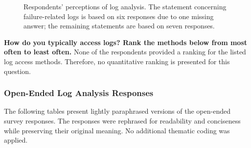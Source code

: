 \begin{figure}[H]
    \caption{Respondents' perceptions of log analysis. The statement
    concerning failure-related logs is based on six responses due to
    one missing answer; the remaining statements are based on seven
    responses.}
    \label{fig:appendix-log-analysis-perceptions}
\end{figure}

\vspace{-0.4em}
{\footnotesize
\noindent
\textbf{How do you typically access logs? Rank the methods below from
most often to least often.}
\smallskip
\noindent
None of the respondents provided a ranking for the listed log access
methods. Therefore, no quantitative ranking is presented for this
question.
}

\vspace{0.5em}
\subsubsection{Open-Ended Log Analysis Responses}
\label{appendix:open-ended-log-analysis}
{\footnotesize
The following tables present lightly paraphrased versions of the
open-ended survey responses. The responses were rephrased for
readability and conciseness while preserving their original meaning.
No additional thematic coding was applied.
}
\vspace{0.2em}

